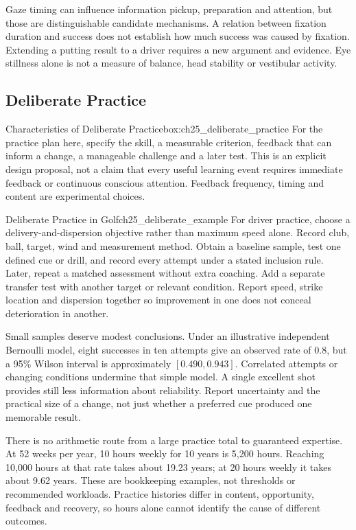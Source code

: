 Gaze timing can influence information pickup, preparation and attention, but those are distinguishable candidate mechanisms. A relation between fixation duration and success does not establish how much success was caused by fixation. Extending a putting result to a driver requires a new argument and evidence. Eye stillness alone is not a measure of balance, head stability or vestibular activity.

\subsection{Deliberate Practice}
\label{subsec:ch25_deliberate_practice}

\begin{principle}{Characteristics of Deliberate Practice}{box:ch25_deliberate_practice}
For the practice plan here, specify the skill, a measurable criterion, feedback that can inform a change, a manageable challenge and a later test. This is an explicit design proposal, not a claim that every useful learning event requires immediate feedback or continuous conscious attention. Feedback frequency, timing and content are experimental choices.
\end{principle}

\begin{example}{Deliberate Practice in Golf}{ch25_deliberate_example}
For driver practice, choose a delivery-and-dispersion objective rather than maximum speed alone. Record club, ball, target, wind and measurement method. Obtain a baseline sample, test one defined cue or drill, and record every attempt under a stated inclusion rule. Later, repeat a matched assessment without extra coaching. Add a separate transfer test with another target or relevant condition. Report speed, strike location and dispersion together so improvement in one does not conceal deterioration in another.
\end{example}

Small samples deserve modest conclusions. Under an illustrative independent Bernoulli model, eight successes in ten attempts give an observed rate of $0.8$, but a 95\% Wilson interval is approximately $[0.490,0.943]$. Correlated attempts or changing conditions undermine that simple model. A single excellent shot provides still less information about reliability. Report uncertainty and the practical size of a change, not just whether a preferred cue produced one memorable result.

There is no arithmetic route from a large practice total to guaranteed expertise. At 52 weeks per year, 10 hours weekly for 10 years is 5,200 hours. Reaching 10,000 hours at that rate takes about 19.23 years; at 20 hours weekly it takes about 9.62 years. These are bookkeeping examples, not thresholds or recommended workloads. Practice histories differ in content, opportunity, feedback and recovery, so hours alone cannot identify the cause of different outcomes.

